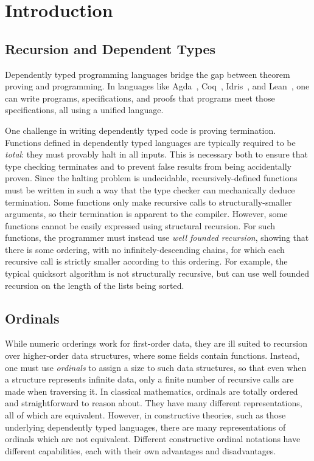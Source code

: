\section{Introduction}
\label{sec:intro}

\subsection{Recursion and Dependent Types}
Dependently typed programming languages
 bridge the gap between theorem proving and programming.
In languages like Agda~\citep{agdaPaper}, Coq~\citep{coqart},
Idris~\citep{DBLP:journals/corr/abs-2104-00480}, and Lean~\citep{10.1007/978-3-319-21401-6_26},
 one can write programs, specifications, and proofs that programs
meet those specifications, all using a unified language.

One challenge in writing dependently typed code is proving termination.
Functions defined in dependently typed languages are typically required to be
\textit{total}: they must provably halt in all inputs.
This is necessary both to ensure that type checking terminates and to prevent
false results from being accidentally proven.
Since the halting problem
is undecidable, recursively-defined functions must be written in such a way that the type checker
can mechanically deduce termination.
Some functions only make recursive calls to structurally-smaller arguments,
so their termination is apparent to the compiler. However, some functions
cannot be easily expressed using structural recursion.
For such functions, the programmer must instead use \textit{well founded recursion}, showing that there is some ordering, with no infinitely-descending
chains, for which each recursive call is strictly smaller according to this ordering. For example, the typical quicksort algorithm is not structurally recursive, but can use well founded recursion on the length of the lists being sorted.

\subsection{Ordinals}

While numeric orderings work for first-order data, they are ill suited to recursion over
higher-order data structures, where some fields contain functions.
Instead, one must use \textit{ordinals} to assign a size to such data structures, so that even
when a structure represents infinite data, only a finite number of recursive calls are made when traversing it.
In classical mathematics, ordinals are totally ordered and straightforward to reason about. They have
many different representations, all of which are equivalent.
However, in constructive theories, such as those underlying dependently typed languages,
there are many representations of ordinals which are not equivalent.
Different constructive ordinal notations have different capabilities, each with their own advantages and disadvantages.

